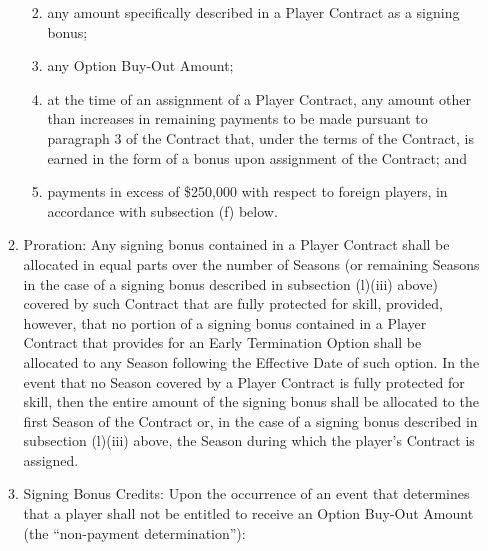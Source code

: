 \documentclass[
]{book}
\providecommand{\tightlist}{%
  \setlength{\itemsep}{0pt}\setlength{\parskip}{0pt}}
\begin{document}
\begin{enumerate}
\begin{enumerate}
    \begin{enumerate}
    \def\labelenumiii{(\roman{enumiii})}
    \tightlist
    \item
      any amount specifically described in a Player Contract as a signing bonus;
    \item
      any Option Buy-Out Amount;
    \item
      at the time of an assignment of a Player Contract, any amount other than increases in remaining payments to be made pursuant to paragraph 3 of the Contract that, under the terms of the Contract, is earned in the form of a bonus upon assignment of the Contract; and
    \item
      payments in excess of \$250,000 with respect to foreign players, in accordance with subsection (f) below.
    \end{enumerate}
  \item
    Proration: Any signing bonus contained in a Player Contract shall be allocated in equal parts over the number of Seasons (or remaining Seasons in the case of a signing bonus described in subsection (l)(iii) above) covered by such Contract that are fully protected for skill, provided, however, that no portion of a signing bonus contained in a Player Contract that provides for an Early Termination Option shall be allocated to any Season following the Effective Date of such option. In the event that no Season covered by a Player Contract is fully protected for skill, then the entire amount of the signing bonus shall be allocated to the first Season of the Contract or, in the case of a signing bonus described in subsection (l)(iii) above, the Season during which the player's Contract is assigned.
  \item
    Signing Bonus Credits: Upon the occurrence of an event that determines that a player shall not be entitled to receive an Option Buy-Out Amount (the ``non-payment determination''):


\end{enumerate}
\end{enumerate}
\end{document}
